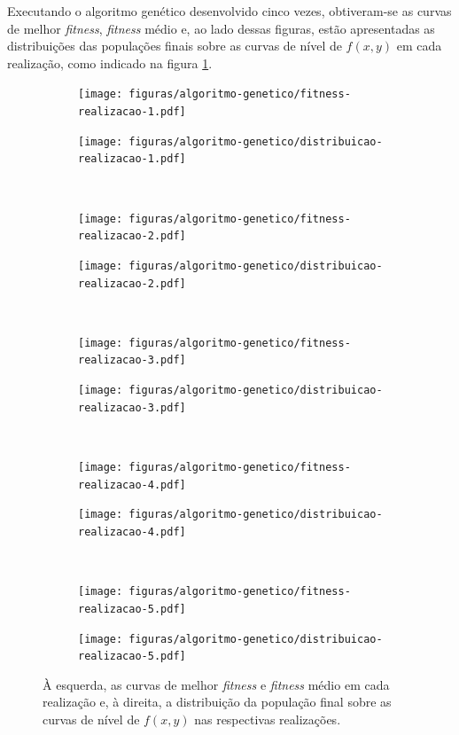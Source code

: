 \documentclass[a4paper, 12pt]{article}
\newcommand{\fitness}{\textit{fitness}\xspace}
\begin{document}
Executando o algoritmo genético desenvolvido cinco vezes, obtiveram-se as curvas de melhor \fitness, \fitness médio e, ao lado dessas figuras, estão apresentadas as distribuições das populações finais sobre as curvas de nível de $f(x,y)$ em cada realização, como indicado na figura \ref{fig:fitness-distribuicao}.
\begin{figure}[!ht]
    \centering
    \begin{subfigure}{0.4\textwidth}
        \texttt{[image: figuras/algoritmo-genetico/fitness-realizacao-1.pdf]}
    \end{subfigure}
    \begin{subfigure}{0.4\textwidth}
        \texttt{[image: figuras/algoritmo-genetico/distribuicao-realizacao-1.pdf]}
    \end{subfigure}
    \hfill
    \\
    \centering
    \begin{subfigure}{0.4\textwidth}
        \texttt{[image: figuras/algoritmo-genetico/fitness-realizacao-2.pdf]}
    \end{subfigure}
    \begin{subfigure}{0.4\textwidth}
        \texttt{[image: figuras/algoritmo-genetico/distribuicao-realizacao-2.pdf]}
    \end{subfigure}
    \hfill
    \\
    \centering
    \begin{subfigure}{0.4\textwidth}
        \texttt{[image: figuras/algoritmo-genetico/fitness-realizacao-3.pdf]}
    \end{subfigure}
    \begin{subfigure}{0.4\textwidth}
        \texttt{[image: figuras/algoritmo-genetico/distribuicao-realizacao-3.pdf]}
    \end{subfigure}
    \hfill
    \\
    \centering
    \begin{subfigure}{0.4\textwidth}
        \texttt{[image: figuras/algoritmo-genetico/fitness-realizacao-4.pdf]}
    \end{subfigure}
    \begin{subfigure}{0.4\textwidth}
        \texttt{[image: figuras/algoritmo-genetico/distribuicao-realizacao-4.pdf]}
    \end{subfigure}
    \hfill
    \\
    \centering
    \begin{subfigure}{0.4\textwidth}
        \texttt{[image: figuras/algoritmo-genetico/fitness-realizacao-5.pdf]}
    \end{subfigure}
    \begin{subfigure}{0.4\textwidth}
        \texttt{[image: figuras/algoritmo-genetico/distribuicao-realizacao-5.pdf]}
    \end{subfigure}
    \hfill
    \caption{À esquerda, as curvas de melhor \fitness e \fitness médio em cada realização e, à direita, a distribuição da população final sobre as curvas de nível de $f(x, y)$ nas respectivas realizações.}
    \label{fig:fitness-distribuicao}
\end{figure}
\end{document}
